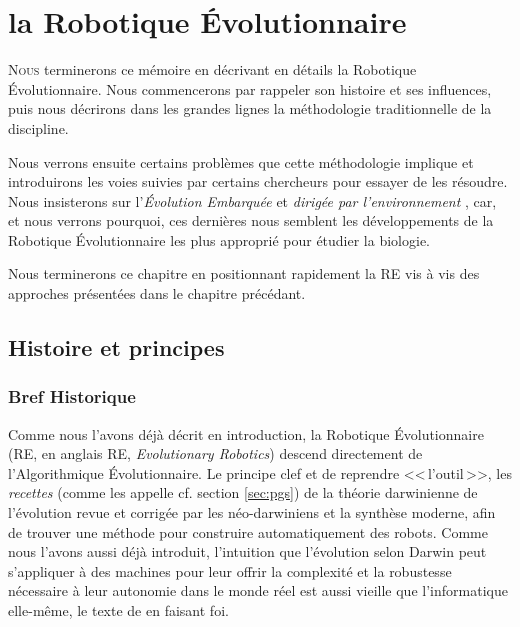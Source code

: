 \chapter{la Robotique Évolutionnaire}\label{ch:RE}
\lettrine[lines=2]{N}{ous} terminerons ce mémoire en décrivant en détails la Robotique \'Evolutionnaire. Nous commencerons par rappeler son histoire et ses influences, puis nous décrirons dans les grandes lignes la méthodologie traditionnelle de la discipline.

Nous verrons ensuite certains problèmes que cette méthodologie implique et introduirons les voies suivies par certains chercheurs pour essayer de les résoudre. Nous insisterons sur l'\emph{\'Evolution Embarquée} \citep{watson02embodiedevolutiondistributingevolutionaryalgorithmpopulationrobots} et \emph{dirigée par l'environnement} \citep{bredeche2012environmentdrivendistributedevolutionaryadaptation}, car, et nous verrons pourquoi, ces dernières nous semblent les développements de la Robotique \'Evolutionnaire les plus approprié pour étudier la biologie.

Nous terminerons ce chapitre en positionnant rapidement la RE vis à vis des approches présentées dans le chapitre précédant.



\section{Histoire et principes}\label{sec:re}
\subsection{Bref Historique}

Comme nous l'avons déjà décrit en introduction, la Robotique Évolutionnaire (RE, en anglais RE, \emph{Evolutionary Robotics}) descend directement de l'Algorithmique Évolutionnaire. Le principe clef et de reprendre <<\,l'outil\,>>, les \emph{recettes} (comme les appelle \cite{godfrey2009darwinian} cf. section \ref{sec:pgs}) de la théorie darwinienne de l'évolution revue et corrigée par les néo-darwiniens et la synthèse moderne, afin de trouver une méthode pour construire automatiquement des robots.
Comme nous l'avons aussi déjà introduit, l'intuition que l'évolution selon Darwin peut s'appliquer à des machines pour leur offrir la complexité et la robustesse nécessaire à leur autonomie dans le monde réel est aussi vieille que l'informatique elle-même, le texte de \cite{turing50computingmachineryintelligence} en faisant foi.

